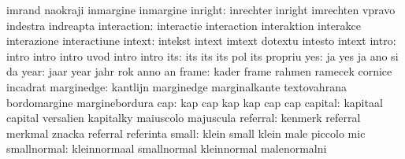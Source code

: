                            imrand                    naokraji
                           inmargine                 inmargine
                  inright: inrechter                 inright
                           imrechten                 vpravo
                           indestra                  indreapta
              interaction: interactie                interaction
                           interaktion               interakce
                           interazione               interactiune
                   intext: intekst                   intext
                           imtext                    dotextu
                           intesto                   intext
                    intro: intro                     intro
                           intro                     uvod
                           intro                     intro
                      its: its                       its
                           its                       pol
                           its                       propriu %
                      yes: ja                        yes
                           ja                        ano
                           si                        da
                     year: jaar                      year
                           jahr                      rok
                           anno                      an
                    frame: kader                     frame
                           rahmen                    ramecek
                           cornice                   incadrat
               marginedge: kantlijn                  marginedge
                           marginalkante             textovahrana
                           bordomargine              marginebordura
                      cap: kap                       cap
                           kap                       kap
                           cap                       cap
                  capital: kapitaal                  capital
                           versalien                 kapitalky
                           maiuscolo                 majuscula
                 referral: kenmerk                   referral
                           merkmal                   znacka
                           referral                  referinta
                    small: klein                     small
                           klein                     male
                           piccolo                   mic
              smallnormal: kleinnormaal              smallnormal
                           kleinnormal               malenormalni
